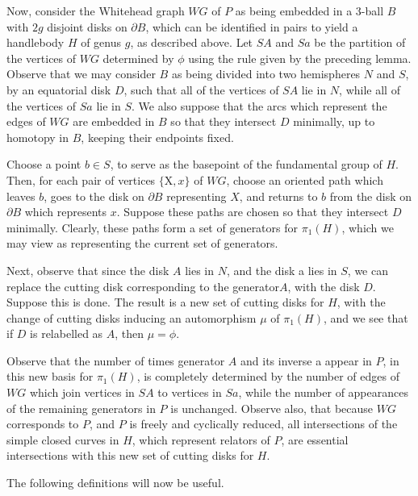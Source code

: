 \documentclass[12pt]{amsart}
\begin{document}
                Now, consider the Whitehead graph $WG$ of $P$ as being embedded in a 3-ball $B$ with $2g$
        disjoint disks on $\partial B$, which can be identified in pairs to yield a handlebody $H$ of genus
        $g$, as described above. Let $SA$ and $Sa$ be the partition of the vertices of $WG$ determined
        by $\phi$ using the rule given by the preceding lemma. Observe that we may consider $B$ as
        being divided into two hemispheres $N$ and $S$, by an equatorial disk $D$, such that all of
        the vertices of $SA$ lie in $N$, while all of the vertices of $Sa$ lie in $S$. We also suppose
        that the arcs which represent the edges of $WG$ are embedded in $B$ so that they intersect $D$
        minimally, up to homotopy in $B$, keeping their endpoints fixed.

                Choose a point $b \in S$, to serve as the basepoint of the fundamental group of $H$. Then,
        for each pair of vertices $\{ $X$,x\}$ of $WG$, choose an oriented path which leaves $b$, goes to
        the disk on $\partial B$ representing $X$, and returns to $b$ from the disk on $\partial B$ which represents $x$.
        Suppose these paths are chosen so that they intersect $D$ minimally. Clearly, these paths
        form a set of generators for $\pi_1(H)$, which we may view as representing the current set of
        generators.
        
        Next, observe that since the disk $A$ lies in $N$, and the
        disk a lies in $S$, we can replace the cutting disk
        corresponding to the generator$A$, with the disk $D$. Suppose
        this is done. The result is a new set of cutting disks for
        $H$, with the change of cutting disks inducing an automorphism
        $\mu$ of $\pi_1(H)$, and we see that if $D$ is relabelled as
        $A$, then $ \mu = \phi$.

                Observe that the number of times generator $A$ and its inverse a appear in $P$, in this
        new basis for $\pi_1(H)$, is completely determined by the number of edges of $WG$ which join
        vertices in $SA$ to vertices in $Sa$, while the number of appearances of the remaining
        generators in $P$ is unchanged. Observe also, that because $WG$ corresponds to $P$, and $P$ is
        freely and cyclically reduced, all intersections of the simple closed curves in $H$, which
        represent relators of $P$, are essential intersections with this new set of cutting disks
        for $H$.
        
                The following definitions will now be useful.
        
\end{document}
